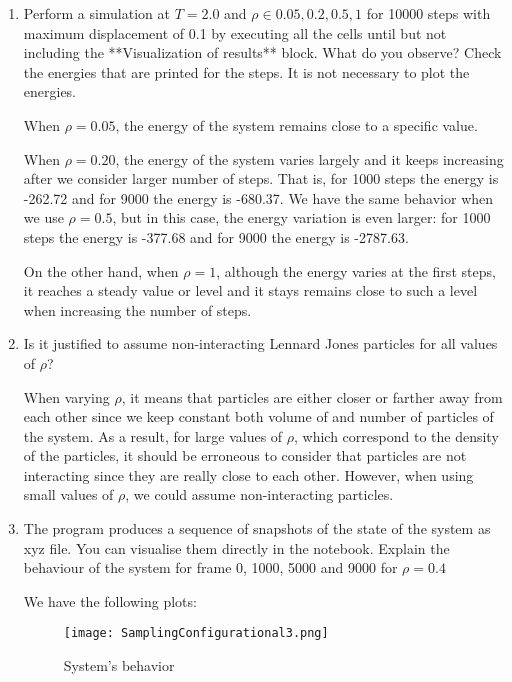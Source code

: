 \documentclass[12pt,letterpaper]{report}
\begin{document}
  \begin{enumerate}
  	\item 
  	Perform a simulation at $T = 2.0$ and $\rho \in 0.05, 0.2, 0.5, 1$ for 10000 steps with maximum displacement of 0.1 by executing all the cells until but not including the **Visualization of results** block. What do you observe? Check the energies that are printed for the steps. It is not necessary to plot the energies.

  	When $\rho = 0.05$, the energy of the system remains close to a specific value.
	
	When $\rho = 0.20$, the energy of the system varies largely and it keeps increasing after we consider larger number of steps. That is, for 1000 steps the energy is -262.72 and for 9000 the energy is -680.37. We have the same behavior when we use $\rho = 0.5$, but in this case, the energy variation is even larger: for 1000 steps the energy is -377.68 and for 9000 the energy is -2787.63.
	
	On the other hand, when $\rho = 1$, although the energy varies at the first steps, it reaches a steady value or level and it stays remains close to such a level when increasing the number of steps.	

  	\item 
  	Is it justified to assume non-interacting Lennard Jones particles for all values of $\rho$?	
  
  	When varying $\rho$, it means that particles are either closer or farther away from each other since we keep constant both volume of and number of particles of the system. As a result, for large values of $\rho$, which correspond to the density of the particles, it should be erroneous to consider that particles are not interacting since they are really close to each other. However, when using small values of $\rho$, we could assume non-interacting particles.
 
  	\item
  	The program produces a sequence of snapshots of the state of the system as xyz file. You can visualise them directly in the notebook. Explain the behaviour of the system for frame 0, 1000, 5000 and 9000 for $\rho=0.4$
  	
  	We have the following plots: 
  	  	
  	\begin{figure}[H]
  		\centering
  		\texttt{[image: SamplingConfigurational3.png]}		
  		\caption{System's behavior}
  		\label{fig::SamplingConfigurational_3}
  	\end{figure} 
  	  	

\end{enumerate}
\end{document}
